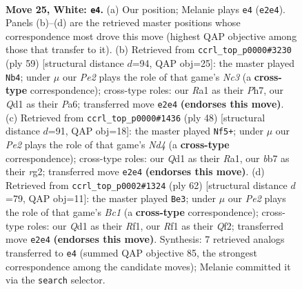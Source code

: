 \documentclass[11pt]{article}
\begin{document}
\clearpage

\begin{figure}[p]\centering
\begin{subfigure}{0.46\textwidth}\centering
\resizebox{\linewidth}{!}{%
\newchessgame
\chessboard[
  setfen={1n2k3/1b6/8/ppb2p2/8/8/PN2Pr2/R2Q1R1K w - - 0 25},
  showmover=false,
  pgfstyle=straightmove, color=movearrow, markmove={e2-e4}
]}
\caption{}
\end{subfigure}\hfill
\begin{subfigure}{0.46\textwidth}\centering
\resizebox{\linewidth}{!}{%
\newchessgame
\chessboard[
  setfen={2k5/2r2p1p/p1nRp3/8/P7/8/PB2KPrP/2R5 b - - 9 30},
  showmover=false,
  pgfstyle=straightmove, color=movearrow, markmove={c6-b4}
]}
\caption{}
\end{subfigure}
\\[4pt]
\begin{subfigure}{0.46\textwidth}\centering
\resizebox{\linewidth}{!}{%
\newchessgame
\chessboard[
  setfen={3r4/pp2k3/2p5/8/3N3b/5p2/PPP3r1/R2R1K2 w - - 0 25},
  showmover=false,
  pgfstyle=straightmove, color=movearrow, markmove={d4-f5}
]}
\caption{}
\end{subfigure}\hfill
\begin{subfigure}{0.46\textwidth}\centering
\resizebox{\linewidth}{!}{%
\newchessgame
\chessboard[
  setfen={r7/1p2N2k/7n/p2p4/3b4/1P4Pq/5Q2/2B2RK1 w - - 1 32},
  showmover=false,
  pgfstyle=straightmove, color=movearrow, markmove={c1-e3}
]}
\caption{}
\end{subfigure}
\caption{\textbf{Move 25, White: \texttt{e4}.} (a) Our position; Melanie plays \texttt{e4} (\texttt{e2e4}). Panels (b)--(d) are the retrieved master positions whose correspondence most drove this move (highest QAP objective among those that transfer to it). (b) Retrieved from \texttt{ccrl\_top\_p0000\#3230} (ply 59) [structural distance $d$=94, QAP obj=25]: the master played \texttt{Nb4}; under $\mu$ our \emph{Pe2} plays the role of that game's \emph{Nc3} (a \textbf{cross-type} correspondence); cross-type roles: our \emph{R}a1 as their \emph{P}h7, our \emph{Q}d1 as their \emph{P}a6; transferred move \texttt{e2e4} \textbf{(endorses this move)}. (c) Retrieved from \texttt{ccrl\_top\_p0000\#1436} (ply 48) [structural distance $d$=91, QAP obj=18]: the master played \texttt{Nf5+}; under $\mu$ our \emph{Pe2} plays the role of that game's \emph{Nd4} (a \textbf{cross-type} correspondence); cross-type roles: our \emph{Q}d1 as their \emph{R}a1, our \emph{b}b7 as their \emph{r}g2; transferred move \texttt{e2e4} \textbf{(endorses this move)}. (d) Retrieved from \texttt{ccrl\_top\_p0002\#1324} (ply 62) [structural distance $d$=79, QAP obj=11]: the master played \texttt{Be3}; under $\mu$ our \emph{Pe2} plays the role of that game's \emph{Bc1} (a \textbf{cross-type} correspondence); cross-type roles: our \emph{Q}d1 as their \emph{R}f1, our \emph{R}f1 as their \emph{Q}f2; transferred move \texttt{e2e4} \textbf{(endorses this move)}. Synthesis: 7 retrieved analogs transferred to \texttt{e4} (summed QAP objective 85, the strongest correspondence among the candidate moves); Melanie committed it via the \texttt{search} selector.}
\label{fig:thought-m48}
\end{figure}
\end{document}
